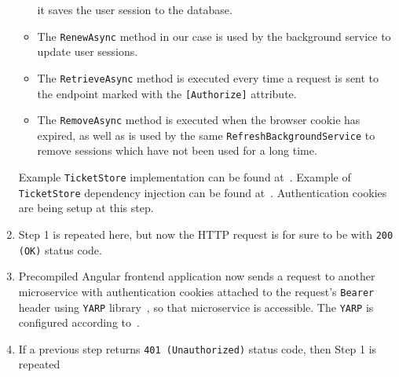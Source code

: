 \begin{enumerate}
\begin{itemize}
        it saves the user session to the database.
        \item The \texttt{RenewAsync} method in our case is used by the background service to update user sessions.
        \item The \texttt{RetrieveAsync} method is executed every time a request is sent to the endpoint marked with the
        \texttt{[Authorize]} attribute.
        \item The \texttt{RemoveAsync} method is executed when the browser cookie has expired,
        as well as is used by the same \texttt{RefreshBackgroundService}
        to remove sessions which have not been used for a long time.
    \end{itemize}
    Example \texttt{TicketStore} implementation can be found at~\cite{ticketStore_2023}.
    Example of \texttt{TicketStore} dependency injection can be found at~\cite{ticketStoreDI_2023}.
    Authentication cookies are being setup at this step.
    \item Step 1 is repeated here, but now the HTTP request is for sure to be with \texttt{200 (OK)} status code.
    \item Precompiled Angular frontend application now sends a request to another microservice with authentication cookies
    attached to the request's \texttt{Bearer} header using \texttt{YARP} library~\cite{microsoftYarp2021},
    so that microservice is accessible.
    The \texttt{YARP} is configured according to~\cite{yarpDI_2023,yarpSectionAppSettings_2023}.
    \item If a previous step returns \texttt{401 (Unauthorized)} status code, then Step 1 is repeated
\end{enumerate}